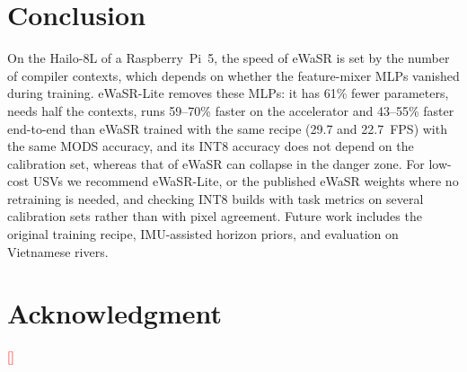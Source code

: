 \documentclass[conference]{IEEEtran}
\newcommand{\tbd}[1]{\textcolor{red}{[#1]}}
\begin{document}
\section{Conclusion}
On the Hailo-8L of a Raspberry~Pi~5, the speed of eWaSR is set by the number of compiler contexts, which depends on whether the feature-mixer MLPs vanished during training. eWaSR-Lite removes these MLPs: it has 61\% fewer parameters, needs half the contexts, runs 59--70\% faster on the accelerator and 43--55\% faster end-to-end than eWaSR trained with the same recipe (29.7 and 22.7~FPS) with the same MODS accuracy, and its INT8 accuracy does not depend on the calibration set, whereas that of eWaSR can collapse in the danger zone. For low-cost USVs we recommend eWaSR-Lite, or the published eWaSR weights where no retraining is needed, and checking INT8 builds with task metrics on several calibration sets rather than with pixel agreement. Future work includes the original training recipe, IMU-assisted horizon priors, and evaluation on Vietnamese rivers.

\section*{Acknowledgment}
\tbd{}



\end{document}
